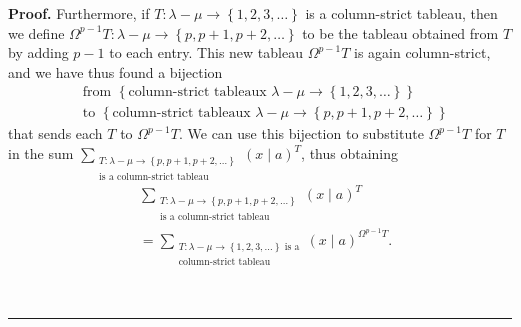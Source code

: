 \documentclass[numbers=enddot,12pt,final,onecolumn,notitlepage]{scrartcl}%
\theoremstyle{definition}
\newenvironment{proof}[1][Proof]{\noindent\textbf{#1.} }{\ \rule{0.5em}{0.5em}}
\let\sumnonlimits\sum
\renewcommand{\sum}{\sumnonlimits\limits}
\begin{document}
\begin{enumerate}
\begin{proof}
Furthermore, if $T:\lambda-\mu\rightarrow\left\{  1,2,3,\ldots\right\}  $ is a
column-strict tableau, then we define $\Omega^{p-1}T:\lambda-\mu
\rightarrow\left\{  p,p+1,p+2,\ldots\right\}  $ to be the tableau obtained
from $T$ by adding $p-1$ to each entry. This new tableau $\Omega^{p-1}T$ is
again column-strict, and we have thus found a bijection
\begin{align*}
&  \text{from }\left\{  \text{column-strict tableaux }\lambda-\mu
\rightarrow\left\{  1,2,3,\ldots\right\}  \right\} \\
&  \text{to }\left\{  \text{column-strict tableaux }\lambda-\mu\rightarrow
\left\{  p,p+1,p+2,\ldots\right\}  \right\}
\end{align*}
that sends each $T$ to $\Omega^{p-1}T$. We can use this bijection to
substitute $\Omega^{p-1}T$ for $T$ in the sum $\sum_{\substack{T:\lambda
-\mu\rightarrow\left\{  p,p+1,p+2,\ldots\right\}  \\\text{is a column-strict
tableau}}}\left(  x\mid a\right)  ^{T}$, thus obtaining%
\begin{align}
&  \sum_{\substack{T:\lambda-\mu\rightarrow\left\{  p,p+1,p+2,\ldots\right\}
\\\text{is a column-strict tableau}}}\left(  x\mid a\right)  ^{T}\nonumber\\
&  =\sum_{\substack{T:\lambda-\mu\rightarrow\left\{  1,2,3,\ldots\right\}
\text{ is a}\\\text{column-strict tableau}}}\left(  x\mid a\right)
^{\Omega^{p-1}T}. \label{pf.lem.p21.slam/mu=tab.shift.sum=sum}%
\end{align}



\end{proof}
\end{enumerate}
\end{document}
